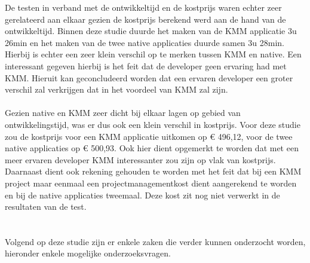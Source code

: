 De testen in verband met de ontwikkeltijd en de kostprijs waren echter zeer gerelateerd aan elkaar gezien de kostprijs berekend werd aan de hand van de ontwikkeltijd. Binnen deze studie duurde het maken van de KMM applicatie 3u 26min en het maken van de twee native applicaties duurde samen 3u 28min. Hierbij is echter een zeer klein verschil op te merken tussen KMM en native. Een interessant gegeven hierbij is het feit dat de developer geen ervaring had met KMM. Hieruit kan geconcludeerd worden dat een ervaren developer een groter verschil zal verkrijgen dat in het voordeel van KMM zal zijn.
\\ \\
Gezien native en KMM zeer dicht bij elkaar lagen op gebied van ontwikkelingstijd, was er dus ook een klein verschil in kostprijs. Voor deze studie zou de kostprijs voor een KMM applicatie uitkomen op \euro{} 496,12, voor de twee native applicaties op \euro{} 500,93. Ook hier dient opgemerkt te worden dat met een meer ervaren developer KMM interessanter zou zijn op vlak van kostprijs. Daarnaast dient ook rekening gehouden te worden met het feit dat bij een KMM project maar eenmaal een projectmanagementkost dient aangerekend te worden en bij de native applicaties tweemaal. Deze kost zit nog niet verwerkt in de resultaten van de test.

\section{}
\label{sec:C-verder-onderzoek}
Volgend op deze studie zijn er enkele zaken die verder kunnen onderzocht worden, hieronder enkele mogelijke onderzoeksvragen.


